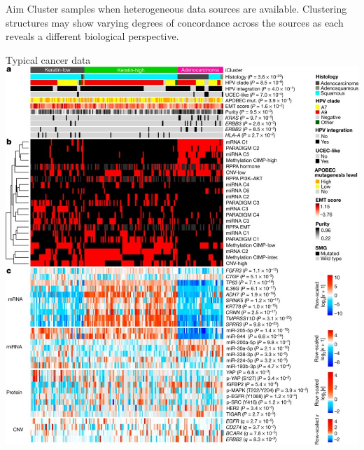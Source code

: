 \documentclass[t, final]{beamer}
\begin{document}
\begin{frame}{}
%
\begin{columns}[t]
\begin{column}{.32\linewidth}

\begin{block}{Aim}
  Cluster samples when heterogeneous data sources are available.
  Clustering structures may show varying degrees of concordance
  across the sources as each reveals a different biological perspective.
\end{block}

\begin{block}{Typical cancer data}
  \includegraphics[width=\textwidth]{Figures/cervical-clusters} \\
  {\small {}}


\end{block}
\end{column}
\end{columns}
\end{frame}
\end{document}
